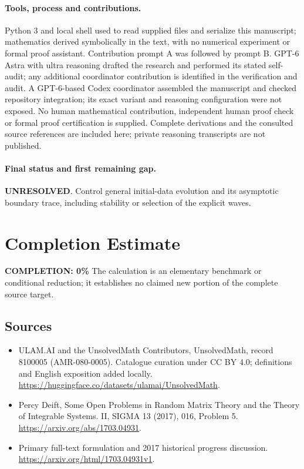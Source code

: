 \documentclass[11pt]{article}
\begin{document}
\paragraph{Tools, process and contributions.}
Python 3 and local shell used to read supplied files and serialize this manuscript; mathematics derived symbolically in the text, with no numerical experiment or formal proof assistant. Contribution prompt A was followed by prompt B. GPT-6 Astra with ultra reasoning drafted the research and performed its stated self-audit; any additional coordinator contribution is identified in the verification and audit. A GPT-6-based Codex coordinator assembled the manuscript and checked repository integration; its exact variant and reasoning configuration were not exposed. No human mathematical contribution, independent human proof check or formal proof certification is supplied. Complete derivations and the consulted source references are included here; private reasoning transcripts are not published.

\paragraph{Final status and first remaining gap.}
\textbf{UNRESOLVED}. Control general initial-data evolution and its asymptotic boundary trace, including stability or selection of the explicit waves.

\section{Completion Estimate}
\noindent\textbf{COMPLETION: 0\%}
The calculation is an elementary benchmark or conditional reduction; it establishes no claimed new portion of the complete source target.

\subsection{Sources}
\begin{itemize}
\item[\hypertarget{source:8100005:1}{S1}] ULAM.AI and the UnsolvedMath Contributors, UnsolvedMath, record 8100005 (AMR-080-0005). Catalogue curation under CC BY 4.0; definitions and English exposition added locally.
\url{https://huggingface.co/datasets/ulamai/UnsolvedMath}.
\item[\hypertarget{source:8100005:2}{S2}] Percy Deift, Some Open Problems in Random Matrix Theory and the Theory of Integrable Systems. II, SIGMA 13 (2017), 016, Problem 5.
\url{https://arxiv.org/abs/1703.04931}.
\item[\hypertarget{source:8100005:3}{S3}] Primary full-text formulation and 2017 historical progress discussion.
\url{https://arxiv.org/html/1703.04931v1}.
\end{itemize}
\label{end:8100005}
\end{document}
